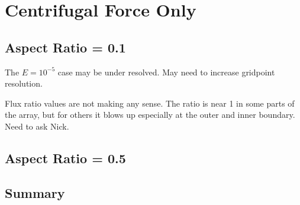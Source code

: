 \section{Centrifugal Force Only}

\subsection{Aspect Ratio = 0.1}

The $E=10^{-5}$ case may be under resolved. May need to increase gridpoint resolution. 

\keradius

\azavgtemperature

\azavgomega
 
\azavgmassflux

\fluxpol

\fluxeq

\condfluxrin

\condfluxrout


\clearpage

Flux ratio values are not making any sense. The ratio is near 1 in some parts of the array, but for others it blows up especially at the outer and inner boundary. Need to ask Nick.

\ekfixtable

\clearpage

\subsection{Aspect Ratio = 0.5}


\keradiusarfive

\azavgtemperaturearfive

\azavgomegaarfive

\azavgmassfluxarfive

\condfluxrinarbig

\condfluxroutarbig

\centrifugaltablearfive

\clearpage

\subsection{Summary}

\kevek
